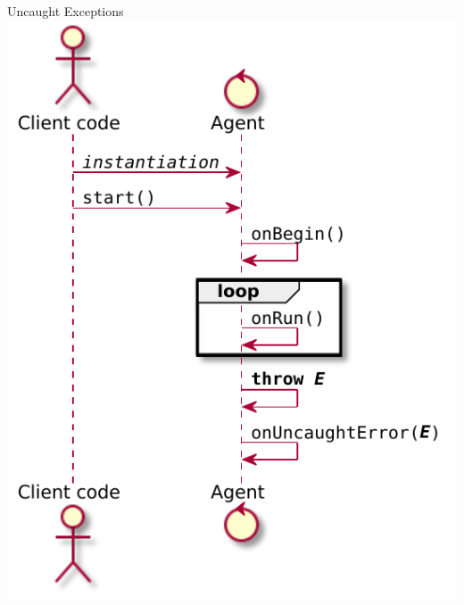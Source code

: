 \documentclass[presentation]{beamer}\mode<presentation>{\usetheme{AMSCesenaPurpleAndGold}}
\begin{document}
\begin{frame}{Uncaught Exceptions}\centering
    \includegraphics[height=.8\textheight]{img/exceptional-flow-1.pdf}
    \hspace{.5cm}

\end{frame}
\end{document}
